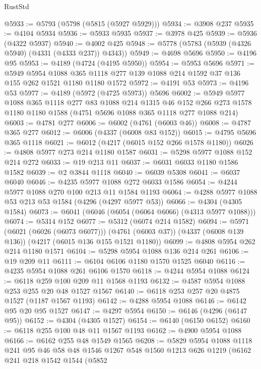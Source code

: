 \begin{lexlean}{RustStd}
\begin{coremodule}
@5933 := @5793 (@5798 (@5815 (@5927 @5929)))
@5934 := @3908 @237
@5935 := @4104 @5934
@5936 := @5933 @5935
@5937 := @3978 @425
@5939 := @5936 (@4322 @5937)
@5940 := @4002 @425
@5948 := @5778 (@5783 (@5939 (@4326 @5940) (@4331 (@4333 @237)) @4343))
@5949 := @4698 @5696
@5950 := @4196 @95
@5953 := @4189 (@4724 (@4195 @5950))
@5954 := @5953 @5696
@5971 := @5949
    @5954
    @1088
    @365
    @1118
    @277
    @139
    @1088
    @214
    @1592
    @37
    @136
    @155
    @262
    @1521
    @1180
    @1180
    @1572
@5972 := @4191 @53
@5973 := @4196 @53
@5977 := @4189 (@5972 (@4725 @5973)) @5696
@6002 := @5949
    @5977
    @1088
    @365
    @1118
    @277
    @83
    @1088
    @214
    @1315
    @46
    @152
    @266
    @273
    @1578
    @1180
    @1180
    @1588
    (@4751 @5696 @1088 @365 @1118 @277 @1088 @214)
@6003 := @4781 @277
@6006 := @6002 (@4761 (@6003 @46))
@6008 := @4787 @365 @277
@6012 := @6006 (@4337 (@6008 @83 @152))
@6015 := @4795 @5696 @365 @1118
@6021 := @6012 (@4217 (@6015 @152 @266 @1578 @1180))
@6026 := @4808 @5977 @273 @214 @1180 @1587
@6031 := @5298 @5977 @1088 @152 @214 @272
@6033 := @19 @213 @11
@6037 := @6031 @6033 @1180 @1586 @1582
@6039 := @2 @3844 @1118
@6040 := @6039 @5308
@6041 := @6037 @6040
@6046 := @4235 @5977 @1088 @272 @6033 @1586
@6054 := @4244 @5977 @1088 @270 @100 @213 @11 @1584 @1193
@6064 := @4288 @5977 @1088 @53 @213 @53 @1584 (@4296 (@4297 @5977 @53))
@6066 := @4304 (@4305 @1584)
@6073 := @6041 (@6046 (@6054 (@6064 @6066) (@4313 @5977 @1088)))
@6074 := @5314 @152
@6077 := @5312 (@6074 @214 @1582)
@6094 := @5971
    (@6021 (@6026 (@6073 @6077)))
    (@4761 (@6003 @37))
    (@4337 (@6008 @139 @136))
    (@4217 (@6015 @136 @155 @1521 @1180))
@6099 := @4808 @5954 @262 @214 @1180 @1571
@6104 := @5298 @5954 @1088 @136 @214 @261
@6106 := @19 @209 @11
@6111 := @6104 @6106 @1180 @1570 @1525 @6040
@6116 := @4235 @5954 @1088 @261 @6106 @1570
@6118 := @4244 @5954 @1088
@6124 := @6118 @259 @100 @209 @11 @1568 @1193
@6132 := @4587 @5954 @1088 @253 @255 @20 @48 @1527 @1567
@6140 := @6118 @253 @257 @20 @4875 @1527 (@1187 @1567 @1193)
@6142 := @4288 @5954 @1088
@6146 := @6142 @95 @20 @95 @1527
@6147 := @4297 @5954
@6150 := @6146 (@4296 (@6147 @95))
@6152 := @4304 (@4305 @1527)
@6154 := @6140 (@6150 @6152)
@6160 := @6118 @255 @100 @48 @11 @1567 @1193
@6162 := @4900 @5954 @1088
@6166 := @6162 @255 @48 @1549 @1565
@6208 := @5829
    @5954
    @1088
    @1118
    @241
    @95
    @46
    @58
    @48
    @1546
    @1267
    @548
    @1560
    @1213
    @626
    @1219
    (@6162
      @241
      @218
      @1542
      @1544
      (@5852

\end{coremodule}
\end{lexlean}
